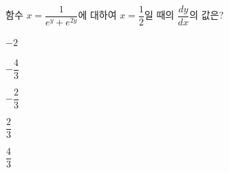 함수 $x=\dfrac{1}{e^y+e^{2y}}$에 대하여 $x=\dfrac{1}{2}$일 때의 $\dfrac{dy}{dx}$의 값은?
\begin{choices32}{\rule[-3ex]{0pt}{8ex}$-2$}{\rule[-3ex]{0pt}{8ex}$-\dfrac{4}{3}$}{\rule[-3ex]{0pt}{8ex}$-\dfrac{2}{3}$}{\rule[-3ex]{0pt}{8ex}$\dfrac{2}{3}$}{\rule[-3ex]{0pt}{8ex}$\dfrac{4}{3}$}\end{choices32}
